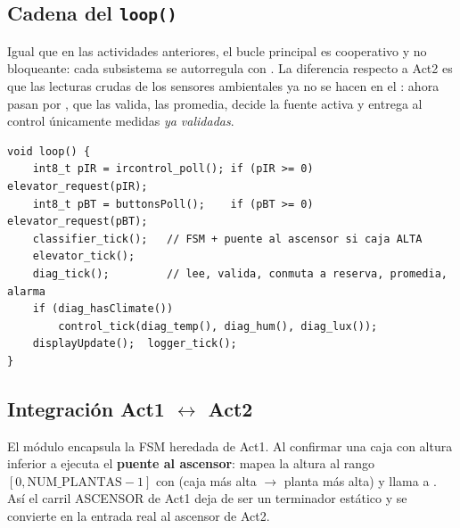 \subsection{Cadena del \texttt{loop()}}

Igual que en las actividades anteriores, el bucle principal es cooperativo y
no bloqueante: cada subsistema se autorregula con . La
diferencia respecto a Act2 es que las lecturas crudas de los sensores
ambientales ya no se hacen en el : ahora pasan por
, que las valida, las promedia, decide la fuente activa
y entrega al control únicamente medidas \emph{ya validadas}.

\begin{lstlisting}[caption={Cadena del \texttt{loop()} integrado.},
                   label={lst:loop}]
void loop() {
    int8_t pIR = ircontrol_poll(); if (pIR >= 0) elevator_request(pIR);
    int8_t pBT = buttonsPoll();    if (pBT >= 0) elevator_request(pBT);
    classifier_tick();   // FSM + puente al ascensor si caja ALTA
    elevator_tick();
    diag_tick();         // lee, valida, conmuta a reserva, promedia, alarma
    if (diag_hasClimate())
        control_tick(diag_temp(), diag_hum(), diag_lux());
    displayUpdate();  logger_tick();
}
\end{lstlisting}

\subsection{Integración Act1 $\leftrightarrow$ Act2}

El módulo  encapsula la FSM heredada de Act1. Al confirmar
una caja con altura inferior a  ejecuta el
\textbf{puente al ascensor}: mapea la altura al rango
$[0,\mathrm{NUM\_PLANTAS}{-}1]$ con  (caja más alta
$\rightarrow$ planta más alta) y llama a .
Así el carril ASCENSOR de Act1 deja de ser un terminador estático y se
convierte en la entrada real al ascensor de Act2.
